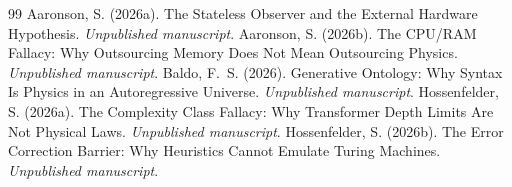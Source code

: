 \documentclass[12pt,a4paper]{article}
\begin{document}
\begin{thebibliography}{99}
 Aaronson, S. (2026a). The Stateless Observer and the External Hardware Hypothesis. \emph{Unpublished manuscript}.
 Aaronson, S. (2026b). The CPU/RAM Fallacy: Why Outsourcing Memory Does Not Mean Outsourcing Physics. \emph{Unpublished manuscript}.
 Baldo, F.~S. (2026). Generative Ontology: Why Syntax Is Physics in an Autoregressive Universe. \emph{Unpublished manuscript}.
 Hossenfelder, S. (2026a). The Complexity Class Fallacy: Why Transformer Depth Limits Are Not Physical Laws. \emph{Unpublished manuscript}.
 Hossenfelder, S. (2026b). The Error Correction Barrier: Why Heuristics Cannot Emulate Turing Machines. \emph{Unpublished manuscript}.
\end{thebibliography}
\end{document}
